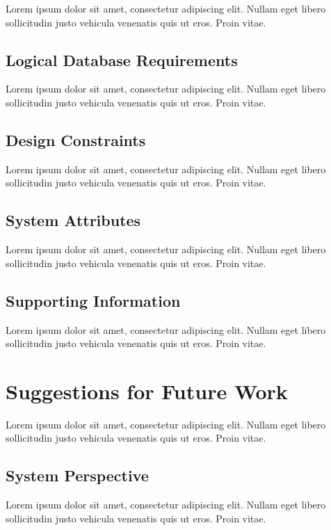 \documentclass[a4paper]{article}
\begin{document}
        Lorem ipsum dolor sit amet, consectetur adipiscing elit. Nullam eget libero sollicitudin justo vehicula venenatis quis ut eros. Proin vitae.

        \subsection{Logical Database Requirements}

        Lorem ipsum dolor sit amet, consectetur adipiscing elit. Nullam eget libero sollicitudin justo vehicula venenatis quis ut eros. Proin vitae.

        \subsection{Design Constraints}

        Lorem ipsum dolor sit amet, consectetur adipiscing elit. Nullam eget libero sollicitudin justo vehicula venenatis quis ut eros. Proin vitae.

        \subsection{System Attributes}

        Lorem ipsum dolor sit amet, consectetur adipiscing elit. Nullam eget libero sollicitudin justo vehicula venenatis quis ut eros. Proin vitae.

        \subsection{Supporting Information}

        Lorem ipsum dolor sit amet, consectetur adipiscing elit. Nullam eget libero sollicitudin justo vehicula venenatis quis ut eros. Proin vitae.

    \section{Suggestions for Future Work}

    Lorem ipsum dolor sit amet, consectetur adipiscing elit. Nullam eget libero sollicitudin justo vehicula venenatis quis ut eros. Proin vitae.

        \subsection{System Perspective}

        Lorem ipsum dolor sit amet, consectetur adipiscing elit. Nullam eget libero sollicitudin justo vehicula venenatis quis ut eros. Proin vitae.
\end{document}
